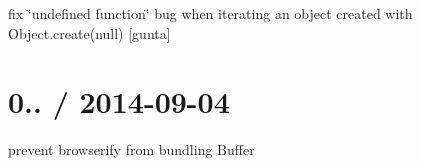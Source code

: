 \begin{DoxyItemize}
\item fix \char`\"{}undefined function\char`\"{} bug when iterating an object created with Object.\+create(null) \mbox{[}gunta\mbox{]}
\end{DoxyItemize}

\section*{0.. / 2014-\/09-\/04 }


\begin{DoxyItemize}
\item prevent browserify from bundling {\ttfamily Buffer} 
\end{DoxyItemize}